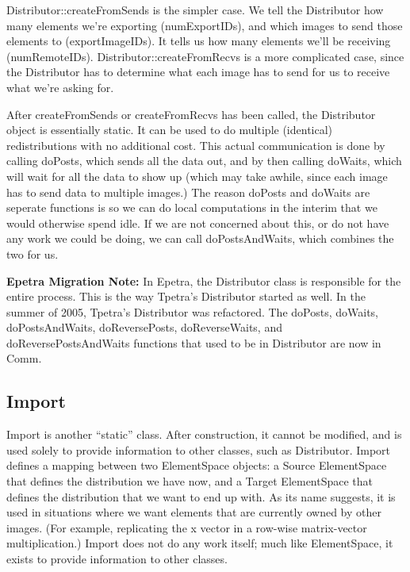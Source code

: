 \documentclass[10pt,relax]{TpetraDesign}
\begin{document}
Distributor::createFromSends is the simpler case. We tell the Distributor how many elements we're exporting (numExportIDs), and which images to send those elements to (exportImageIDs). It tells us how many elements we'll be receiving (numRemoteIDs). Distributor::createFromRecvs is a more complicated case, since the Distributor has to determine what each image has to send for us to receive what we're asking for.

After createFromSends or createFromRecvs has been called, the Distributor object is essentially static. It can be used to do multiple (identical) redistributions with no additional cost. This actual communication is done by calling doPosts, which sends all the data out, and by then calling doWaits, which will wait for all the data to show up (which may take awhile, since each image has to send data to multiple images.) The reason doPosts and doWaits are seperate functions is so we can do local computations in the interim that we would otherwise spend idle. If we are not concerned about this, or do not have any work we could be doing, we can call doPostsAndWaits, which combines the two for us.

\textbf{Epetra Migration Note:} In Epetra, the Distributor class is responsible for the entire process. This is the way Tpetra's Distributor started as well. In the summer of 2005, Tpetra's Distributor was refactored. The doPosts, doWaits, doPostsAndWaits, doReversePosts, doReverseWaits, and doReversePostsAndWaits functions that used to be in Distributor are now in Comm. 


%
\subsection{Import}

Import is another ``static'' class. After construction, it cannot be modified, and is used solely to provide information to other classes, such as Distributor. Import defines a mapping between two ElementSpace objects: a Source ElementSpace that defines the distribution we have now, and a Target ElementSpace that defines the distribution that we want to end up with. As its name suggests, it is used in situations where we want elements that are currently owned by other images. (For example, replicating the x vector in a row-wise matrix-vector multiplication.) Import does not do any work itself; much like ElementSpace, it exists to provide information to other classes. 
\end{document}
